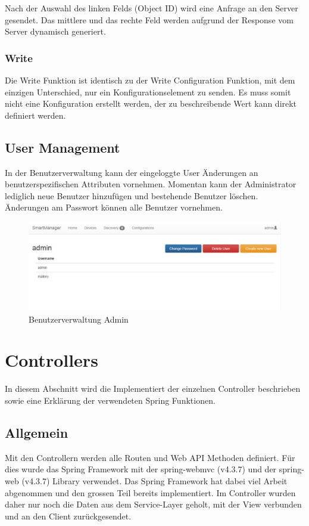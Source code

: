 Nach der Auswahl des linken Felds (Object ID) wird eine Anfrage an den Server gesendet. Das mittlere und das rechte Feld werden aufgrund der Response vom Server dynamisch generiert.

\subsubsection{Write}
Die Write Funktion ist identisch zu der Write Configuration Funktion, mit dem einzigen Unterschied, nur ein Konfigurationselement zu senden. Es muss somit nicht eine Konfiguration erstellt werden, der zu beschreibende Wert kann direkt definiert werden.

\subsection{User Management}
In der Benutzerverwaltung kann der eingeloggte User Änderungen an benutzerspezifischen Attributen vornehmen. Momentan kann der Administrator lediglich neue Benutzer hinzufügen und bestehende Benutzer löschen. Änderungen am Passwort können alle Benutzer vornehmen. 

\begin{figure}[H]
\centering
\includegraphics[scale=0.6]{../04_Realisierung/images/userinterface/usermanagement.png}
\caption{Benutzerverwaltung Admin}
\end{figure}

\newpage

\section{Controllers}
In diesem Abschnitt wird die Implementiert der einzelnen Controller beschrieben sowie eine Erklärung der verwendeten Spring Funktionen.

\subsection{Allgemein}
Mit den Controllern werden alle Routen und Web API Methoden definiert. Für dies wurde das Spring Framework mit der spring-webmvc (v4.3.7) und der spring-web (v4.3.7) Library verwendet. Das Spring Framework hat dabei viel Arbeit abgenommen und den grossen Teil bereits implementiert. Im Controller wurden daher nur noch die Daten aus dem Service-Layer geholt, mit der View verbunden und an den Client zurückgesendet.

